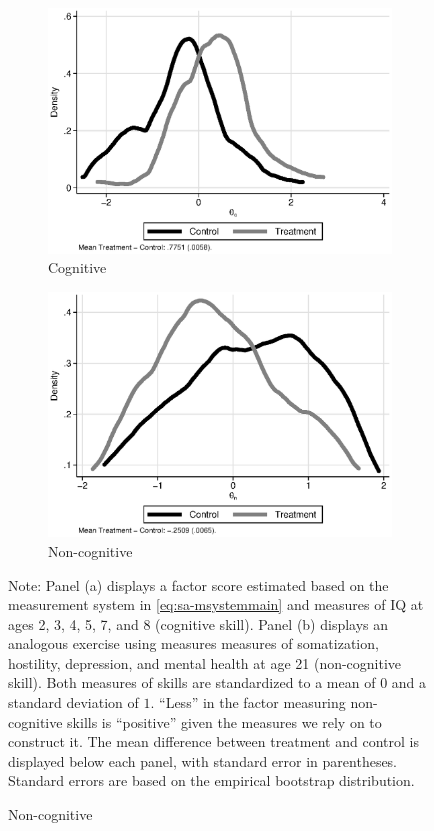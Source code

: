 \begin{figure}[!htbp]
\centering
\caption{Estimates of Cognitive ($\theta_{c}^d$) and Non-cognitive Skills ($\theta_{n}^d$)}\label{figure:factorsm}
\begin{subfigure}[h]{0.5\textwidth}
		\centering
		\caption{Cognitive} \label{fig:c}
		\includegraphics[width=\textwidth]{output/abccare_cfactor.eps}
\end{subfigure}%
\begin{subfigure}[h]{0.5\textwidth}
	\centering
	\caption{Non-cognitive} \label{fig:n}
		\includegraphics[width=\textwidth]{output/abccare_nfactor.eps}
\end{subfigure}
\footnotesize \justify
Note: Panel (a) displays a factor score estimated based on the measurement system in \eqref{eq:sa-msystemmain} and measures of IQ at ages 2, 3, 4, 5, 7, and 8 (cognitive skill). Panel (b) displays an analogous exercise using measures measures of somatization, hostility, depression, and mental health at age 21 (non-cognitive skill). Both measures of skills are standardized to a mean of $0$ and a standard deviation of $1$. ``Less'' in the factor measuring non-cognitive skills is ``positive'' given the measures we rely on to construct it. The mean difference between treatment and control is displayed below each panel, with standard error in parentheses. Standard errors are based on the empirical bootstrap distribution.
\end{figure}

